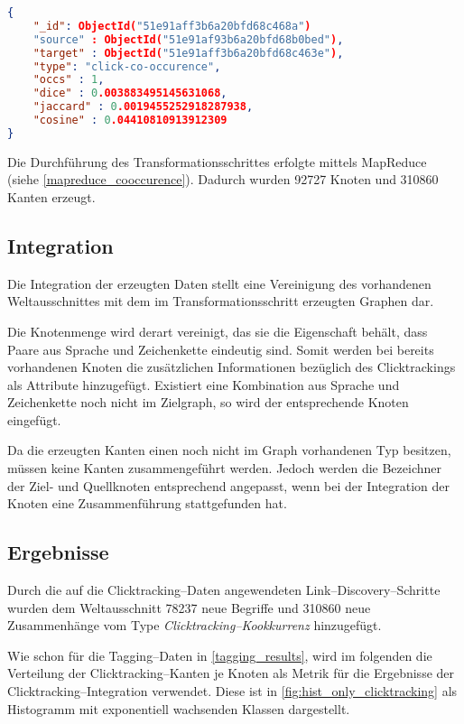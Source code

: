 \begin{lstlisting}[language=json, label={lst:click_edge}, caption={JSON--Beispiel für ein aus den Clicktracking--Daten erzeugtes Kantenobjekt}]
{
    "_id": ObjectId("51e91aff3b6a20bfd68c468a")
    "source" : ObjectId("51e91af93b6a20bfd68b0bed"),
    "target" : ObjectId("51e91aff3b6a20bfd68c463e"),
    "type": "click-co-occurence",
    "occs" : 1,
    "dice" : 0.003883495145631068,
    "jaccard" : 0.0019455252918287938,
    "cosine" : 0.04410810913912309
}
\end{lstlisting}

Die Durchführung des Transformationsschrittes erfolgte mittels MapReduce (siehe \cref{mapreduce_cooccurence}). Dadurch wurden \num{92727} Knoten und \num{310860} Kanten erzeugt.

\subsection{Integration}
\label{click_integration}

Die Integration der erzeugten Daten stellt eine Vereinigung des vorhandenen Weltausschnittes mit dem im Transformationsschritt erzeugten Graphen dar.

Die Knotenmenge wird derart vereinigt, das sie die Eigenschaft behält, dass Paare aus Sprache und Zeichenkette eindeutig sind. Somit werden bei bereits vorhandenen Knoten die zusätzlichen Informationen bezüglich des Clicktrackings als Attribute hinzugefügt. Existiert eine Kombination aus Sprache und Zeichenkette noch nicht im Zielgraph, so wird der entsprechende Knoten eingefügt.

Da die erzeugten Kanten einen noch nicht im Graph vorhandenen Typ besitzen, müssen keine Kanten zusammengeführt werden. Jedoch werden die Bezeichner der Ziel- und Quellknoten entsprechend angepasst, wenn bei der Integration der Knoten eine Zusammenführung stattgefunden hat.

\subsection{Ergebnisse}

Durch die auf die Clicktracking--Daten angewendeten Link--Discovery--Schritte wurden dem Weltausschnitt \num{78237} neue Begriffe und \num{310860} neue Zusammenhänge vom Type \emph{Clicktracking--Kookkurrenz} hinzugefügt.

Wie schon für die Tagging--Daten in \cref{tagging_results}, wird im folgenden die Verteilung der Clicktracking--Kanten je Knoten als Metrik für die Ergebnisse der Clicktracking--Integration verwendet. Diese ist in \cref{fig:hist_only_clicktracking} als Histogramm mit exponentiell wachsenden Klassen dargestellt.

